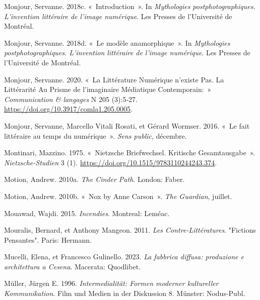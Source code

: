 \begin{CSLReferences}{1}{0}
\leavevmode{}%
Monjour, Servanne. 2018c. {«~{Introduction}~»}. In \emph{{Mythologies
postphotographiques. L'invention litt{é}raire de l'image num{é}rique}}.
{Les Presses de l'Universit{é} de Montr{é}al}.

\leavevmode{}%
Monjour, Servanne. 2018d. {«~{Le mod{è}le anamorphique}~»}. In
\emph{{Mythologies postphotographiques. L'invention litt{é}raire de
l'image num{é}rique}}. {Les Presses de l'Universit{é} de Montr{é}al}.

\leavevmode{}%
Monjour, Servanne. 2020. {«~La Litt{é}rature Num{é}rique n'existe Pas.
{La} Litt{é}rarit{é} Au Prisme de l'imaginaire M{é}diatique
Contemporain:~»} \emph{Communication \& langages} N{\textdegree} 205
(3):5‑27. \url{https://doi.org/10.3917/comla1.205.0005}.

\leavevmode{}%
Monjour, Servanne, Marcello Vitali Rosati, et Gérard Wormser. 2016.
{«~{Le fait litt{é}raire au temps du num{é}rique}~»}. \emph{Sens
public}, décembre.

\leavevmode{}%
Montinari, Mazzino. 1975. {«~Nietzsche {Briefwechsel}. {Kritische
Gesamtausgabe}~»}. \emph{Nietzsche-Studien} 3 (1).
\url{https://doi.org/10.1515/9783110244243.374}.

\leavevmode{}%
Motion, Andrew. 2010a. \emph{The {Cinder Path}}. {London}: {Faber}.

\leavevmode{}%
Motion, Andrew. 2010b. {«~Nox by {Anne Carson}~»}. \emph{The Guardian},
juillet.

\leavevmode{}%
Mouawad, Wajdi. 2015. \emph{{Incendies}}. {Montreal}: {Lem{é}ac}.

\leavevmode{}%
Mouralis, Bernard, et Anthony Mangeon. 2011. \emph{Les
Contre-Litt{é}ratures}. "{Fictions} Pensantes". {Paris}: {Hermann}.

\leavevmode{}%
Mucelli, Elena, et Francesco Gulinello. 2023. \emph{{La fabbrica
diffusa: produzione e architettura a Cesena}}. {Macerata}: {Quodlibet}.

\leavevmode{}%
Müller, Jürgen E. 1996. \emph{{Intermedialit{ä}t: Formen moderner
kultureller Kommunikation}}. {Film und Medien in der Diskussion} 8.
{M{ü}nster}: {Nodus-Publ}.


\end{CSLReferences}
